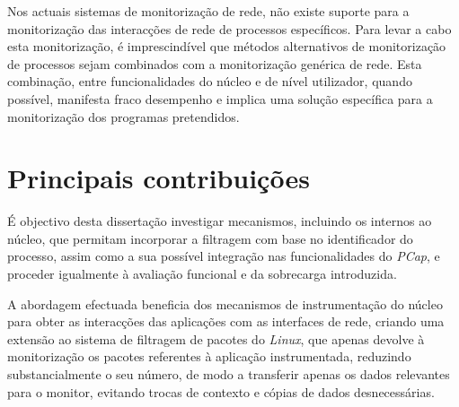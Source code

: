 Nos actuais sistemas de monitorização de rede, não existe suporte para a monitorização das interacções de rede de processos específicos.
Para levar a cabo esta monitorização, é imprescindível que métodos alternativos de monitorização de processos sejam combinados com a monitorização genérica de rede.
Esta combinação, entre funcionalidades do núcleo e de nível utilizador, quando possível, manifesta fraco desempenho e implica uma solução específica para a monitorização dos programas pretendidos.



\section{Principais contribuições} 
\label{sec:intro_contribuicoes}

É objectivo desta dissertação investigar mecanismos, incluindo os internos ao núcleo, que permitam incorporar a filtragem com base no identificador do processo, assim como a sua possível integração nas funcionalidades do \textit{PCap}, e proceder igualmente à avaliação funcional e da sobrecarga introduzida.

A abordagem efectuada beneficia dos mecanismos de instrumentação do núcleo para obter as interacções das aplicações com as interfaces de rede, criando uma extensão ao sistema de filtragem de pacotes do \textit{Linux}, que apenas devolve à monitorização os pacotes referentes à aplicação instrumentada, reduzindo substancialmente o seu número, de modo a transferir apenas os dados relevantes para o monitor, evitando trocas de contexto e cópias de dados desnecessárias.

